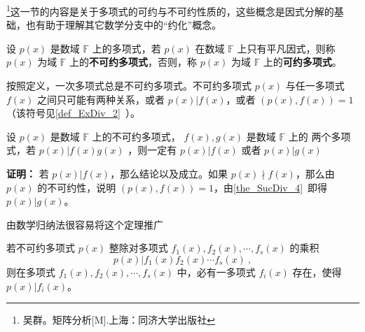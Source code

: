 

\footnote{吴群。矩阵分析[M].上海：同济大学出版社}这一节的内容是关于多项式的可约与不可约性质的，这些概念是因式分解的基础，也有助于理解其它数学分支中的“约化”概念。

\begin{definition}{}\label{def_RedPol_1}
设 $p(x)$ 是数域 $\mathbb{F}$ 上的多项式，若 $p(x)$ 在数域 $\mathbb{F}$ 上只有平凡因式，则称 $p(x)$ 为域 $\mathbb{F}$ 上的\textbf{不可约多项式}，否则，称 $p(x)$ 为域 $\mathbb{F}$ 上的\textbf{可约多项式}。
\end{definition}
按照定义，一次多项式总是不可约多项式。不可约多项式 $p(x)$ 与任一多项式 $f(x)$ 之间只可能有两种关系，或者 $p(x)|f(x)$，或者 $(p(x),f(x))=1$（该符号见\autoref{def_ExDiv_2}~）。

\begin{theorem}{}
设 $p(x)$ 是数域 $\mathbb{F}$ 上的不可约多项式， $f(x),g(x)$ 是数域 $\mathbb{F}$ 上的 两个多项式，若 $p(x)|f(x)g(x)$ ，则一定有 $p(x)|f(x)$ 或者 $p(x)|g(x)$
\end{theorem}
\textbf{证明：} 若 $p(x)|f(x)$，那么结论以及成立。如果 $p(x)\nmid f(x)$，那么由 $p(x)$ 的不可约性，说明 $(p(x),f(x))=1$，由\autoref{the_SucDiv_4}~即得 $p(x)|g(x)$。

由数学归纳法很容易将这个定理推广
\begin{theorem}{}\label{the_RedPol_1}
若不可约多项式 $p(x)$ 整除对多项式 $f_1(x),f_2(x),\cdots,f_s(x)$ 的乘积
\begin{equation}
p(x)|f_1(x)f_2(x)\cdots f_s(x)~,
\end{equation}
则在多项式 $f_1(x),f_2(x),\cdots,f_s(x)$ 中，必有一多项式 $f_i(x)$ 存在，使得 $p(x)|f_i(x)$。
\end{theorem}